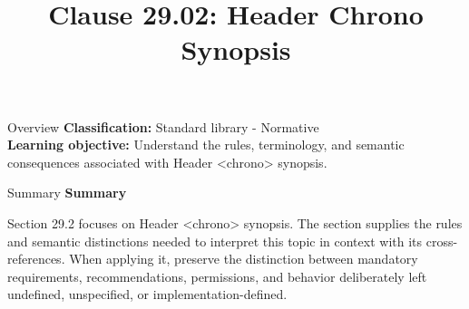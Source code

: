 \documentclass[10pt,letterpaper]{article}
\title{Clause 29.02: Header Chrono Synopsis}
\author{}
\date{}
\begin{document}
\maketitle
\begin{CornellOverviewBox}{Overview}
\textbf{Classification:} Standard library - Normative\\[2pt]
\textbf{Learning objective:} Understand the rules, terminology, and semantic consequences associated with Header <chrono> synopsis.
\end{CornellOverviewBox}\begin{CornellSummaryBox}{Summary}
{\sffamily\bfseries\color{Accent} Summary}\par\vspace{3pt}Section 29.2 focuses on Header <chrono> synopsis. The section supplies the rules and semantic distinctions needed to interpret this topic in context with its cross-references. When applying it, preserve the distinction between mandatory requirements, recommendations, permissions, and behavior deliberately left undefined, unspecified, or implementation-defined.
\end{CornellSummaryBox}
\end{document}
